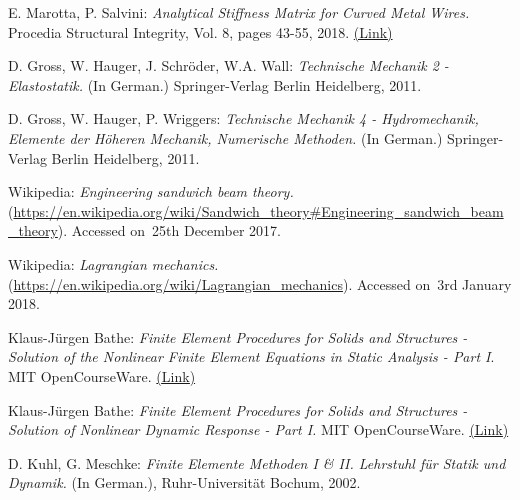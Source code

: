 \begin{thebibliography}{99}
 E. Marotta, P. Salvini: \textit{Analytical Stiffness Matrix for Curved Metal Wires.} Procedia Structural Integrity, Vol. 8, pages 43-55, 2018. \href{https://www.sciencedirect.com/science/article/pii/S2452321617305000/pdf?md5=976b080cb40aa72bdc62a081d098b4dc&pid=1-s2.0-S2452321617305000-main.pdf}{(\underline{Link})}

 D. Gross, W. Hauger, J. Schr{\"o}der, W.A. Wall: \textit{Technische Mechanik 2 - Elastostatik.} (In German.) Springer-Verlag Berlin Heidelberg, 2011.

 D. Gross, W. Hauger, P. Wriggers: \textit{Technische Mechanik 4 - Hydromechanik, Elemente der H{\"o}heren Mechanik, Numerische Methoden.} (In German.) Springer-Verlag Berlin Heidelberg, 2011.

 Wikipedia: \textit{Engineering sandwich beam theory.} (\url{https://en.wikipedia.org/wiki/Sandwich_theory#Engineering_sandwich_beam_theory}). Accessed on~25th December 2017.

 Wikipedia: \textit{Lagrangian mechanics.} (\url{https://en.wikipedia.org/wiki/Lagrangian_mechanics}). Accessed on~3rd January 2018.


 Klaus-J{\"u}rgen Bathe: \textit{Finite Element Procedures for Solids and Structures - Solution of the Nonlinear Finite Element Equations in Static Analysis - Part I}. MIT OpenCourseWare. \href{http://ocw.mit.edu/resources/res-2-002-finite-element-procedures-for-solids-and-structures-spring-2010/nonlinear/lecture-10/MITRES2_002S10_lec10.pdf}{(\underline{Link})}

 Klaus-J{\"u}rgen Bathe: \textit{Finite Element Procedures for Solids and Structures - Solution of Nonlinear Dynamic Response - Part I.} MIT OpenCourseWare. \href{http://ocw.mit.edu/resources/res-2-002-finite-element-procedures-for-solids-and-structures-spring-2010/nonlinear/lecture-13/MITRES2_002S10_lec13.pdf}{(\underline{Link})}

 D. Kuhl, G. Meschke: \textit{Finite Elemente Methoden I \& II. Lehrstuhl f{\"u}r Statik und Dynamik.} (In German.), Ruhr-Universit{\"a}t Bochum, 2002.

\end{thebibliography}